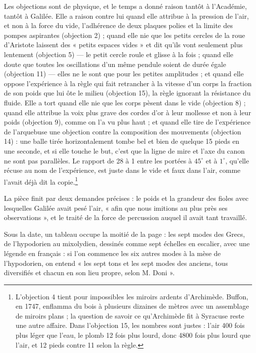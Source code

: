 \documentclass[11pt,a4paper]{article}
\begin{document}
Les objections sont de physique, et le temps a donné raison tantôt à l'Académie,
tantôt à Galilée. Elle a raison contre lui quand elle attribue à la pression de
l'air, et non à la force du vide, l'adhérence de deux plaques polies et la limite
des pompes aspirantes (objection 2) ; quand elle nie que les petits cercles de la
roue d'Aristote laissent des « petits espaces vides » et dit qu'ils vont
seulement plus lentement (objection 5) — le petit cercle roule et glisse à la
fois ; quand elle doute que toutes les oscillations d'un même pendule soient de
durée égale (objection 11) — elles ne le sont que pour les petites amplitudes ;
et quand elle oppose l'expérience à la règle qui fait retrancher à la vitesse
d'un corps la fraction de son poids que lui ôte le milieu (objection 15), la
règle ignorant la résistance du fluide. Elle a tort quand elle nie que les corps
pèsent dans le vide (objection 8) ; quand elle attribue la voix plus grave des
cordes d'or à leur mollesse et non à leur poids (objection 9), comme on l'a vu
plus haut ; et quand elle tire de l'expérience de l'arquebuse une objection
contre la composition des mouvements (objection 14) : une balle tirée
horizontalement tombe bel et bien de quelque 15 pieds en une seconde, et si
elle touche le but, c'est que la ligne de mire et l'axe du canon ne sont pas
parallèles. Le rapport de 28 à 1 entre les portées à $45^\circ$ et à $1^\circ$,
qu'elle récuse au nom de l'expérience, est juste dans le vide et faux dans
l'air, comme l'avait déjà dit la copie.\footnote{L'objection 4 tient pour
impossibles les miroirs ardents d'Archimède. Buffon, en 1747, enflamma du bois à
plusieurs dizaines de mètres avec un assemblage de miroirs plans ; la question
de savoir ce qu'Archimède fit à Syracuse reste une autre affaire. Dans
l'objection 15, les nombres sont justes : l'air 400 fois plus léger que l'eau,
le plomb 12 fois plus lourd, donc 4800 fois plus lourd que l'air, et 12 pieds
contre 11 selon la règle.}

La pièce finit par deux demandes précises : le poids et la grandeur des
fioles avec lesquelles Galilée avait pesé l'air, « afin que nous imitions au plus
près ses observations », et le traité de la force de percussion auquel il avait
tant travaillé.

Sous la date, un tableau occupe la moitié de la page : les sept modes des Grecs,
de l'hypodorien au mixolydien, dessinés comme sept échelles en escalier, avec une
légende en français : si l'on commence les six autres modes à la mèse de
l'hypodorien, on entend « les sept tons et les sept modes des anciens, tous
diversifiés et chacun en son lieu propre, selon M. Doni ».
\end{document}
